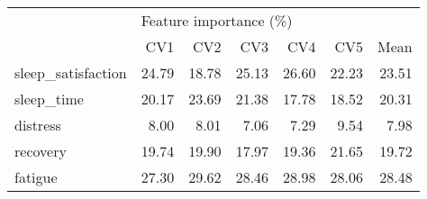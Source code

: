 \begin{tabular}{lrrrrrr}
\toprule
{} & \multicolumn{6}{l}{Feature importance (\%)} \\
{} &                    CV1 &    CV2 &    CV3 &    CV4 &    CV5 &   Mean \\
\midrule
sleep\_satisfaction &                  24.79 &  18.78 &  25.13 &  26.60 &  22.23 &  23.51 \\
sleep\_time         &                  20.17 &  23.69 &  21.38 &  17.78 &  18.52 &  20.31 \\
distress           &                   8.00 &   8.01 &   7.06 &   7.29 &   9.54 &   7.98 \\
recovery           &                  19.74 &  19.90 &  17.97 &  19.36 &  21.65 &  19.72 \\
fatigue            &                  27.30 &  29.62 &  28.46 &  28.98 &  28.06 &  28.48 \\
\bottomrule
\end{tabular}
